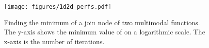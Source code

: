 \documentclass[english]{article}
\begin{document}
\begin{figure}
  \texttt{[image: figures/1d2d\_perfs.pdf]}
  \caption{Finding the minimum of a join node of two multimodal functions. The y-axis shows the minimum value of on a logarithmic scale. The x-axis is the number of iterations.}
  \label{1d2d_perfs}
\end{figure}






\appendix
\end{document}
